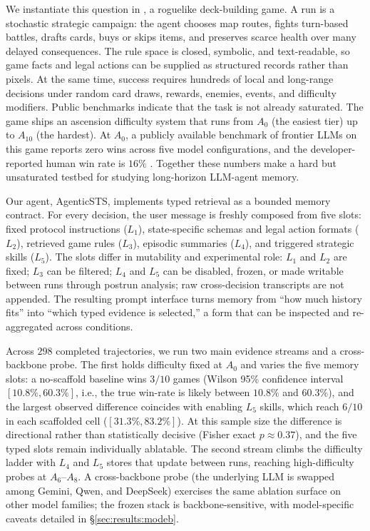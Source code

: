 We instantiate this question in \stspad{}, a roguelike
deck-building game. A run is a stochastic strategic campaign:
the agent chooses map routes, fights turn-based battles, drafts
cards, buys or skips items, and preserves scarce health over
many delayed consequences. The rule space is closed, symbolic, and
text-readable, so game facts and legal actions can be supplied as
structured records rather than pixels. At the same time, success
requires hundreds of local and long-range decisions under random
card draws, rewards, enemies, events, and difficulty modifiers.
Public benchmarks indicate that the task is not already saturated.
The game ships an ascension difficulty system that runs from $A_0$
(the easiest tier) up to $A_{10}$ (the hardest). At $A_0$,
a publicly available benchmark of frontier LLMs on
this game reports zero wins across five model configurations, and
the developer-reported human win rate is $16\%$
\citep{agi-eval-spire-2026,megacrit-neowsletter-may2026}. Together these numbers make \stspad{} a hard but unsaturated
testbed for studying long-horizon LLM-agent memory.

Our agent, AgenticSTS, implements typed retrieval as a bounded
memory contract.
For every decision, the user message is freshly composed from five
slots: fixed protocol instructions ($L_1$), state-specific schemas
and legal action formats ($L_2$), retrieved game rules ($L_3$),
episodic summaries ($L_4$), and triggered strategic skills ($L_5$).
The slots differ in mutability and experimental role: $L_1$ and
$L_2$ are fixed; $L_3$ can be filtered; $L_4$ and $L_5$ can be
disabled, frozen, or made writable between runs through postrun
analysis; raw
cross-decision transcripts are not appended. The resulting prompt
interface turns memory from ``how much history fits'' into ``which
typed evidence is selected,'' a form that can be inspected and
re-aggregated across conditions.

Across $298$ completed trajectories, we run two main evidence
streams and a cross-backbone probe.
The first holds difficulty fixed at $A_0$ and varies the five
memory slots: a no-scaffold baseline wins $3/10$ games (Wilson
95\% confidence interval $[10.8\%, 60.3\%]$, i.e., the true
win-rate is likely between $10.8\%$ and $60.3\%$), and the largest
observed difference coincides with enabling $L_5$ skills, which
reach $6/10$ in each scaffolded cell ($[31.3\%, 83.2\%]$). At this
sample size the difference is directional rather than statistically
decisive (Fisher exact $p\approx0.37$), and the five typed slots
remain individually ablatable. The second stream climbs the
difficulty ladder with $L_4$ and $L_5$ stores that update
between runs, reaching high-difficulty probes at $A_6$--$A_8$.
A cross-backbone probe (the underlying LLM is swapped among
Gemini, Qwen, and DeepSeek) exercises the same ablation surface on
other model families; the frozen stack is backbone-sensitive, with
model-specific caveats detailed in \S\ref{sec:results:modeb}.


